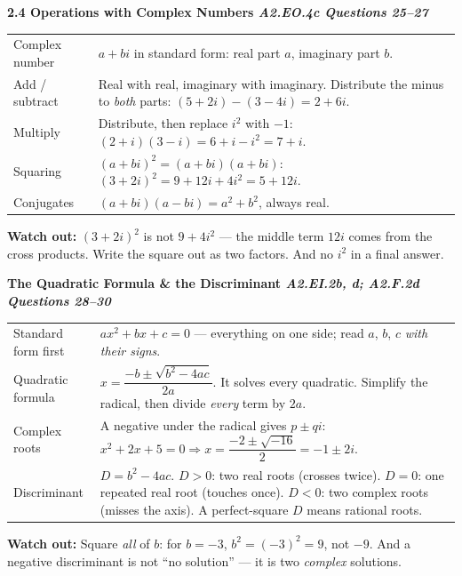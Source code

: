 \documentclass[10pt]{article}
\newcommand{\sghead}[2]{%
  \boxguard[10]%
  \vspace{4pt}\par\noindent
  \colorbox{forest}{\parbox{\dimexpr\linewidth-2\fboxsep}{%
    \small\color{white}\bfseries #1 \hfill \textmd{\itshape\scriptsize\color{forestmid} #2}}}%
  \vspace{2pt}\par}
\newcommand{\sgwatch}[1]{%
  \vspace{1pt}\par\noindent
  \colorbox{redbg}{\parbox{\dimexpr\linewidth-2\fboxsep}{%
    \footnotesize\textbf{\textcolor{redacc}{Watch out:}} #1}}%
  \vspace{1pt}\par}
\newcommand{\sgtabsetup}{\renewcommand{\arraystretch}{1.06}\footnotesize}
\begin{document}
\sghead{2.4 \quad Operations with Complex Numbers}{A2.EO.4c \;\textbullet\; Questions 25--27}
{\sgtabsetup
\begin{tabularx}{\linewidth}{@{} G X @{}}
Complex number & $a+bi$ in standard form: real part $a$, imaginary part $b$. \\
Add / subtract & Real with real, imaginary with imaginary. Distribute the minus to \emph{both}
  parts: $(5+2i)-(3-4i)=2+6i$. \\
Multiply & Distribute, then replace $i^2$ with $-1$: $(2+i)(3-i)=6+i-i^2=7+i$. \\
Squaring & $(a+bi)^2=(a+bi)(a+bi)$: $(3+2i)^2=9+12i+4i^2=5+12i$. \\
Conjugates & $(a+bi)(a-bi)=a^2+b^2$, always real. \\
\end{tabularx}}
\sgwatch{$(3+2i)^2$ is not $9+4i^2$ --- the middle term $12i$ comes from the cross products. Write
the square out as two factors. And no $i^2$ in a final answer.}

\sghead{The Quadratic Formula \& the Discriminant}{A2.EI.2b, d; A2.F.2d \;\textbullet\; Questions 28--30}
{\sgtabsetup
\begin{tabularx}{\linewidth}{@{} G X @{}}
Standard form first & $ax^2+bx+c=0$ --- everything on one side; read $a$, $b$, $c$ \emph{with
  their signs}. \\
Quadratic formula & $x=\dfrac{-b\pm\sqrt{b^2-4ac}}{2a}$. It solves every quadratic. Simplify the
  radical, then divide \emph{every} term by $2a$. \\
Complex roots & A negative under the radical gives $p\pm qi$:
  $x^2+2x+5=0 \Rightarrow x=\dfrac{-2\pm\sqrt{-16}}{2}=-1\pm2i$. \\
Discriminant & $D=b^2-4ac$. $D>0$: two real roots (crosses twice). $D=0$: one repeated real root
  (touches once). $D<0$: two complex roots (misses the axis). A perfect-square $D$ means rational
  roots. \\
\end{tabularx}}
\sgwatch{Square \emph{all} of $b$: for $b=-3$, $b^2=(-3)^2=9$, not $-9$. And a negative
discriminant is not ``no solution'' --- it is two \emph{complex} solutions.}
\end{document}
